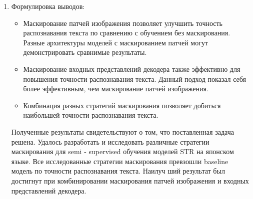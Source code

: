 \begin{enumerate}
     \item  Формулировка  выводов:
     \begin{itemize}
          \item Маскирование патчей изображения позволяет улучшить точность распознавания
               текста по сравнению с обучением без маскирования. Разные архитектуры моделей с
               маскированием патчей могут демонстрировать сравнимые результаты.
          \item Маскирование входных представлений декодера также эффективно для повышения
               точности распознавания текста. Данный подход показал себя более эффективным, чем
               маскирование патчей изображения.
          \item Комбинация разных стратегий маскирования позволяет добиться наибольшей точности распознавания текста.
     \end{itemize}
     Полученные результаты свидетельствуют о том, что поставленная задача решена. Удалось разработать и исследовать различные стратегии маскирования для semi -
     supervised обучения моделей STR на японском языке. Все исследованные стратегии
     маскирования превзошли baseline модель по точности распознавания текста. Наилуч
     ший результат был достигнут при комбинировании маскирования патчей изображения
     и входных представлений декодера.
\end{enumerate}

\newpage

